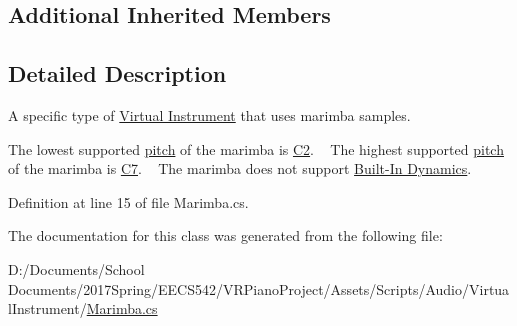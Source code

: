 \subsection*{Additional Inherited Members}


\subsection{Detailed Description}
A specific type of \hyperlink{group___v_i}{Virtual Instrument} that uses marimba samples. 

The lowest supported \hyperlink{group___music_enums_ga508f69b199ea518f935486c990edac1d}{pitch} of the marimba is \hyperlink{group___music_enums_gga508f69b199ea518f935486c990edac1daf1a543f5a2c5d49bc5dde298fcf716e4}{C2}. ~\newline
 The highest supported \hyperlink{group___music_enums_ga508f69b199ea518f935486c990edac1d}{pitch} of the marimba is \hyperlink{group___music_enums_gga508f69b199ea518f935486c990edac1da517d42f048d2dd422533522c796aaf37}{C7}. ~\newline
 The marimba does not support \hyperlink{group___audio_DefBID}{Built-\/\+In Dynamics}. 

Definition at line 15 of file Marimba.\+cs.



The documentation for this class was generated from the following file\+:\begin{DoxyCompactItemize}
\item 
D\+:/\+Documents/\+School Documents/2017\+Spring/\+E\+E\+C\+S542/\+V\+R\+Piano\+Project/\+Assets/\+Scripts/\+Audio/\+Virtual\+Instrument/\hyperlink{_marimba_8cs}{Marimba.\+cs}\end{DoxyCompactItemize}
